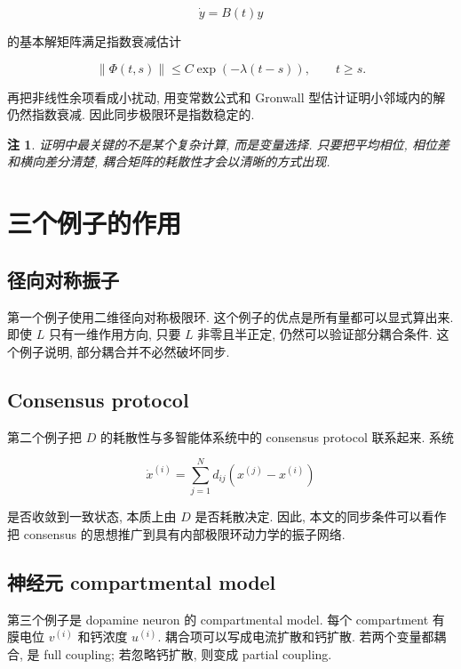 \documentclass[oneside]{ctexart}
\newtheorem{remark}{注}[section]
\begin{document}
\begin{equation}
    \dot{y}=B(t)y
\end{equation}

的基本解矩阵满足指数衰减估计

\begin{equation}
    \|\Phi(t,s)\|\leq C\exp(-\lambda(t-s)),
    \qquad t\geq s.
\end{equation}

再把非线性余项看成小扰动, 用变常数公式和 Gronwall 型估计证明小邻域内的解仍然指数衰减. 因此同步极限环是指数稳定的.

\begin{remark}
    证明中最关键的不是某个复杂计算, 而是变量选择. 只要把平均相位, 相位差和横向差分清楚, 耦合矩阵的耗散性才会以清晰的方式出现.
\end{remark}

\section{三个例子的作用}

\subsection{径向对称振子}

第一个例子使用二维径向对称极限环. 这个例子的优点是所有量都可以显式算出来. 即使 $L$ 只有一维作用方向, 只要 $L$ 非零且半正定, 仍然可以验证部分耦合条件. 这个例子说明, 部分耦合并不必然破坏同步.

\subsection{Consensus protocol}

第二个例子把 $D$ 的耗散性与多智能体系统中的 consensus protocol 联系起来. 系统

\begin{equation}
    \dot{x}^{(i)}=\sum_{j=1}^N d_{ij}(x^{(j)}-x^{(i)})
\end{equation}

是否收敛到一致状态, 本质上由 $D$ 是否耗散决定. 因此, 本文的同步条件可以看作把 consensus 的思想推广到具有内部极限环动力学的振子网络.

\subsection{神经元 compartmental model}

第三个例子是 dopamine neuron 的 compartmental model. 每个 compartment 有膜电位 $v^{(i)}$ 和钙浓度 $u^{(i)}$. 耦合项可以写成电流扩散和钙扩散. 若两个变量都耦合, 是 full coupling; 若忽略钙扩散, 则变成 partial coupling.
\end{document}
